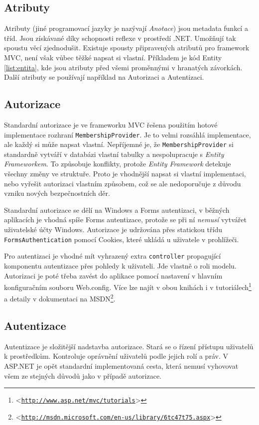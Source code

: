 \documentclass[11pt,twoside,a4paper]{book}
\let\oldUrl\url
\renewcommand\url[1]{<\texttt{\oldUrl{#1}}>}
\begin{document}
\subsection{Atributy}
\label{sec:atributy}
Atributy (jiné programovací jazyky je nazývají \textit{Anotace}) jsou metadata funkcí a tříd. Jsou získávané díky schopnosti reflexe v prostředí .NET. Umožňují tak spoustu věcí zjednodušit. Existuje spousty připravených atributů pro framework MVC, není však vůbec těžké napsat si vlastní. Příkladem je kód Entity \ref{list:entita}, kde jsou atributy před všemi proměnnými v hranatých závorkách. Další atributy se používají například na \textsf{Autorizaci} a \textsf{Autentizaci}.


\subsection{Autorizace}
Standardní autorizace je ve frameworku MVC řešena použitím hotové implementace rozhraní \texttt{MembershipProvider}. Je to velmi rozsáhlá implementace, ale každý si může napsat vlastní.
Nepříjemné je, že \texttt{MembershipProvider} si standardně vytváří v databázi vlastní tabulky a nespolupracuje s \textit{Entity Frameworkem}. To způsobuje konflikty, protože \textit{Entity Framework} detekuje všechny změny ve struktuře. Proto je vhodnější napsat si vlastní implementaci, nebo vyřešit autorizaci vlastním způsobem, což se ale nedoporučuje z důvodu vzniku nových bezpečnostních děr.

Standardní autorizace se dělí na \textsf{Windows} a \textsf{Forms} autentizaci, v běžných aplikacích je vhodná spíše \textsf{Forms} autentizace, protože se při ní \textit{nemusí} vytvářet uživatelské účty Windows. Autorizace je udržována přes statickou třídu \texttt{FormsAuthentication} pomocí Cookies, které ukládá u uživatele v prohlížeči.

Pro autentizaci je vhodné mít vyhrazený extra \texttt{controller} propagující komponentu autentizace přes \textsf{pohledy} k uživateli. Jde vlastně o roli \textsf{modelu}. Autorizaci je poté třeba zavést do aplikace pomocí nastavení v hlavním konfiguračním souboru \textsf{Web.config}. Více lze najít v obou knihách \cite{MVC1} \cite{MVC2} i v tutoriálech\footnote{\url{http://www.asp.net/mvc/tutorials}} a detaily v dokumentaci na MSDN\footnote{\url{http://msdn.microsoft.com/en-us/library/6tc47t75.aspx}}.

\subsection{Autentizace}
Autentizace je složitější nadstavba autorizace. Stará se o řízení přístupu uživatelů k prostředkům. Kontroluje oprávnění uživatelů podle jejich rolí a práv. V ASP.NET je opět standardní implementovaná cesta, která nemusí vyhovovat všem ze stejných důvodů jako v případě autorizace.
\end{document}
